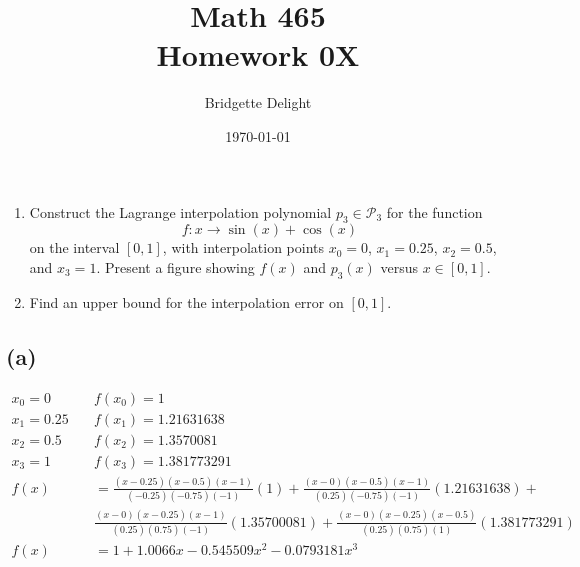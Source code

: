 \documentclass{article}
\title{{\large Math 465}\\ Homework 0X}
\author{Bridgette Delight}
\date{\today}
\begin{document}
\maketitle

\section{}
\begin{enumerate}[label = (\alph*)]
    \item  Construct the Lagrange interpolation polynomial $p_3 \in \mathcal{P}_3$ for the function
    \begin{equation*}
        f: x \to \sin(x) + \cos(x)
    \end{equation*}
    on the interval $[0, 1]$, with interpolation points $x_0 = 0$, $x_1 = 0.25$, $x_2 = 0.5$, and $x_3 = 1$. Present a figure showing $f(x)$ and $p_3(x)$ versus $x \in [0, 1]$.
    \item  Find an upper bound for the interpolation error on $[0, 1]$.
\end{enumerate}
\vspace{10mm}

\subsection*{(a)}

\begin{align*}
    x_0 = 0 \quad& f(x_0) = 1\\
    x_1 = 0.25 \quad& f(x_1) = 1.21631638\\
    x_2 = 0.5 \quad& f(x_2) = 1.3570081\\
    x_3 = 1 \quad& f(x_3) = 1.381773291\\
    f(x) &=  \frac{(x-0.25)(x-0.5)(x-1)}{(-0.25)(-0.75)(-1)}(1)
        +  \frac{(x-0)(x-0.5)(x-1)}{(0.25)(-0.75)(-1)}(1.21631638)+\\
        &  \frac{(x-0)(x-0.25)(x-1)}{(0.25)(0.75)(-1)}(1.35700081)
        +  \frac{(x-0)(x-0.25)(x-0.5)}{(0.25)(0.75)(1)}(1.381773291)\\
    f(x) &= 1 + 1.0066x - 0.545509 x^2 -0.0793181 x^3
\end{align*}
\end{document}
